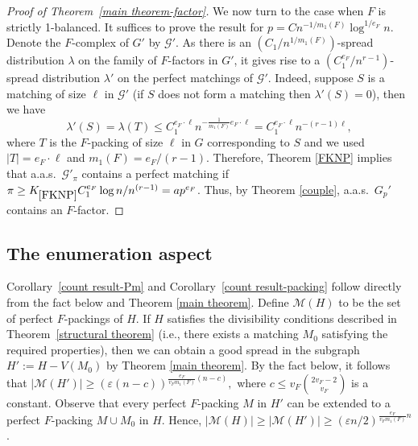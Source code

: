 \documentclass[11pt, letterpaper]{amsart}
\theoremstyle{plain}
\numberwithin{equation}{section}
\theoremstyle{definition}
\newcommand\card[1]{\left| #1 \right|}
\begin{document}
\begin{proof}[Proof of Theorem~\ref{main theorem-factor}]
        We now turn to the case when \(F\) is strictly 1-balanced. It suffices to prove the result for \(p=Cn^{-1/m_1(F)}\log^{1/e_F}n\).
Denote the \(F\)-complex of \(G'\) by \(\mathcal{G}'\).
As there is an $\left(C_1/n^{1/m_1(F)}\right)$-spread distribution $\lambda$ on the family of $F$-factors in $G'$, it gives rise to a \(\left(C_1^{e_F}/n^{r-1}\right)\)-spread distribution $\lambda'$ on the perfect matchings of \(\mathcal{G}'\). 
Indeed, suppose $S$ is a matching of size $\ell$ in \(\mathcal{G}'\) (if $S$ does not form a matching then $\lambda'(S)=0$), then we have
\[
\lambda'(S) = \lambda(T)\le C_1^{e_F\cdot \ell} n^{-\frac{1}{m_1(F)}e_F\cdot \ell} = C_1^{e_F\cdot \ell} n^{-(r-1)\ell},
\]
where $T$ is the $F$-packing of size $\ell$ in $G$ corresponding to $S$ and we used $|T|=e_F\cdot \ell$ and $m_1(F)=e_F/(r-1)$.
Therefore, Theorem \ref{FKNP} implies that a.a.s.~\(\mathcal{G}'_{\pi}\) contains a perfect matching if \(\pi\ge K_{\ref{FKNP}}C_1^{e_F}\log n/ n^{(r-1)}=ap^{e_F}\). Thus, by Theorem \ref{couple}, a.a.s.~\(G_p'\) contains an \(F\)-factor.
\end{proof}

    \subsection{The enumeration aspect}

    Corollary~\ref{count result-Pm} and Corollary~\ref{count result-packing} follow directly from the fact below and Theorem \ref{main theorem}. 
    Define \(\mathcal{M}(H)\) to be the set of perfect \(F\)-packings of \(H\). 
    If \(H\) satisfies the divisibility conditions described in Theorem~\ref{structural theorem} (i.e., there exists a matching \(M_0\) satisfying the required properties), then we can obtain a good spread in the subgraph \(H':=H-V(M_0)\) by Theorem \ref{main theorem}.
    By the fact below, it follows that \(
    \card{\mathcal{M}(H')}\ge\left(\varepsilon (n-c)\right)^{\frac{e_F}{v_Fm_1(F)}(n-c)},\) where \(c\le v_F\binom{2v_F-2}{v_F}\) is a constant. 
    Observe that every perfect \(F\)-packing \(M\) in \(H'\) can be extended to a perfect \(F\)-packing \(M \cup M_0\) in \(H\). 
    Hence, \(\card{\mathcal{M}(H)}\ge\card{\mathcal{M}(H')}\ge (\varepsilon n/2)^{\frac{e_F}{v_F m_1(F)}n}\).
    
\end{document}
